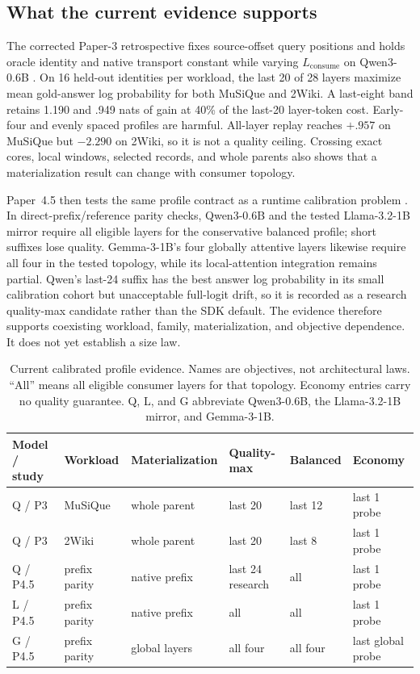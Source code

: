 \documentclass[11pt]{article}
\begin{document}
\iffalse
\subsection{What the current evidence supports}

The corrected Paper-3 retrospective fixes source-offset query positions and holds oracle identity
and native transport constant while varying $L_{\mathrm{consume}}$ on Qwen3-0.6B
\cite{simao2026materialization}.  On 16 held-out identities per workload, the last 20 of 28 layers
maximize mean gold-answer log probability for both MuSiQue and 2Wiki.  A last-eight band retains
1.190 and .949 nats of gain at 40\% of the last-20 layer-token cost.  Early-four and evenly spaced
profiles are harmful.  All-layer replay reaches $+.957$ on MuSiQue but $-2.290$ on 2Wiki, so it is
not a quality ceiling.  Crossing exact cores, local windows, selected records, and whole parents
also shows that a materialization result can change with consumer topology.

Paper~4.5 then tests the same profile contract as a runtime calibration problem
\cite{simao2026runtime}.  In direct-prefix/reference parity checks, Qwen3-0.6B and the tested
Llama-3.2-1B mirror require all eligible layers for the conservative balanced profile; short suffixes
lose quality.  Gemma-3-1B's four globally attentive layers likewise require all four in the tested
topology, while its local-attention integration remains partial.  Qwen's last-24 suffix has the best
answer log probability in its small calibration cohort but unacceptable full-logit drift, so it is
recorded as a research quality-max candidate rather than the SDK default.  The evidence therefore
supports coexisting workload, family, materialization, and objective dependence.  It does not yet
establish a size law.

\begin{table}[H]
\centering
\scriptsize
\caption{Current calibrated profile evidence.  Names are objectives, not architectural laws.
``All'' means all eligible consumer layers for that topology.  Economy entries carry no quality
guarantee.  Q, L, and G abbreviate Qwen3-0.6B, the Llama-3.2-1B mirror, and Gemma-3-1B.}
\label{tab:layer-profile-evidence}
\begin{tabular}{@{}llllll@{}}
\toprule
Model / study & Workload & Materialization & Quality-max & Balanced & Economy \\
\midrule
Q / P3 & MuSiQue & whole parent & last 20 & last 12 & last 1 probe \\
Q / P3 & 2Wiki & whole parent & last 20 & last 8 & last 1 probe \\
Q / P4.5 & prefix parity & native prefix & last 24 research & all & last 1 probe \\
L / P4.5 & prefix parity & native prefix & all & all & last 1 probe \\
G / P4.5 & prefix parity & global layers & all four & all four & last global probe \\
\bottomrule
\end{tabular}
\end{table}
\end{document}
